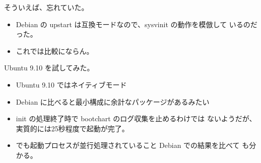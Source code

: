 \begin{frame}{そういえば、忘れていた。}
 \begin{itemize}
  \item Debian の upstart は互換モードなので、sysvinit の動作を模倣して
	いるのだった。
  \item これでは比較にならん。
 \end{itemize}
\end{frame}

\begin{frame}{Ubuntu 9.10 を試してみた。}
\begin{minipage}[t]{0.48\hsize}
\begin{itemize}
 \item Ubuntu 9.10 ではネイティブモード
 \item Debian に比べると最小構成に余計なパッケージがあるみたい
 \item init の処理終了時で bootchart のログ収集を止めるわけでは
       ないようだが、実質的には25秒程度で起動が完了。
 \item でも起動プロセスが並行処理されていること Debian での結果を比べて
       も分かる。
\end{itemize}
\end{minipage}
\begin{minipage}[t]{0.48\hsize}
\begin{figure}[h]
\begin{center}

\end{center}
\end{figure}
\end{minipage}
\end{frame}
